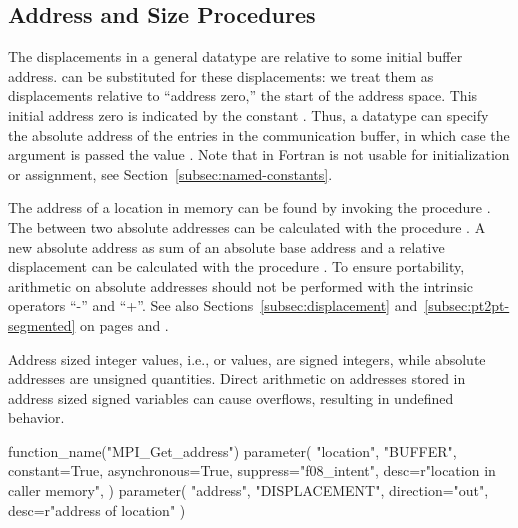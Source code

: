 \subsection{Address and Size Procedures}
\label{subsec:pt2pt-addfunc}

The displacements in a general datatype are relative to some initial buffer
address.
can be substituted for these
displacements: we treat them as displacements relative to ``address
zero,'' the start of the address space.  This initial address zero is
indicated by the constant .  Thus, a datatype can
specify the absolute address of the entries in the communication
buffer, in which case the  argument is passed the value
.
Note that in Fortran  is not usable for initialization or
assignment, see Section~\ref{subsec:named-constants}.

The address of a location in memory can be found by invoking the
procedure\flushline
{}.
The 
between two absolute addresses
can be calculated with the procedure . A new absolute
address as sum of an absolute base address and a relative displacement can be
calculated with the procedure . To ensure portability,
arithmetic on absolute addresses should not be performed with the intrinsic
operators ``-'' and ``+''. See also Sections~\ref{subsec:displacement}
and~\ref{subsec:pt2pt-segmented} on pages \pageref{subsec:displacement} and
\pageref{subsec:pt2pt-segmented}.

\begin{rationale}
Address sized integer values, i.e.,  or
\vlgb{} values, are signed integers, while
absolute addresses are unsigned quantities. Direct arithmetic on addresses
stored in address sized signed variables can cause overflows, resulting in
undefined behavior.
\end{rationale}

%
\begin{mpi-binding}
    function_name("MPI_Get_address")
    parameter(
        "location",
        "BUFFER",
        constant=True,
        asynchronous=True,
        suppress="f08_intent",
        desc=r"location in caller memory",
    )
    parameter(
        "address", "DISPLACEMENT", direction="out", desc=r"address of location"
    )
\end{mpi-binding}

